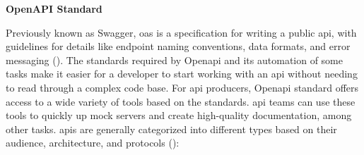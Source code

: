 \textbf{OpenAPI Standard}

Previously known as Swagger, \acrshort{oas} is a specification for writing a public \acrshort{api}, with
guidelines for details like endpoint naming conventions, data formats, and error messaging
(\cite{openapistandard}). The standards required by Open\acrshort{api} and its automation of some tasks
make it easier for a developer to start working with an \acrshort{api} without needing to read through
a complex code base. For \acrshort{api} producers, Open\acrshort{api} standard offers access to a wide
variety of tools based on the standards. \acrshort{api} teams can use these tools to quickly up mock
servers and create high-quality documentation, among other tasks.
\acrshort{api}s are generally categorized into different types based on their audience, architecture, and
protocols (\cite{typesofapi}):


